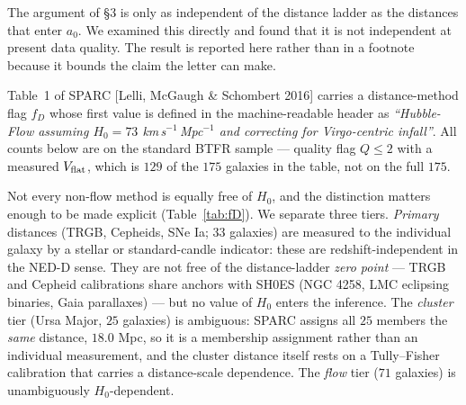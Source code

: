 \documentclass[11pt,a4paper]{article}
\begin{document}
The argument of \S3 is only as independent of the distance ladder as the
distances that enter $a_0$. We examined this directly and found that it is
not independent at present data quality. The result is reported here rather
than in a footnote because it bounds the claim the letter can make.

Table~1 of SPARC [Lelli, McGaugh \& Schombert 2016] carries a distance-method
flag $f_D$ whose first value is defined in the machine-readable header as
\emph{``Hubble-Flow assuming $H_0 = 73$ km\,s$^{-1}$\,Mpc$^{-1}$ and
correcting for Virgo-centric infall''}. All counts below are on the standard
BTFR sample --- quality flag $Q \leq 2$ with a measured $V_{\rm flat}$,
which is $129$ of the $175$ galaxies in the table, not on the full $175$.

Not every non-flow method is equally free of $H_0$, and the distinction
matters enough to be made explicit (Table~\ref{tab:fD}). We separate three
tiers. \emph{Primary} distances (TRGB, Cepheids, SNe Ia; $33$ galaxies) are
measured to the individual galaxy by a stellar or standard-candle indicator:
these are redshift-independent in the NED-D sense. They are not free of the
distance-ladder \emph{zero point} --- TRGB and Cepheid calibrations share
anchors with SH0ES (NGC 4258, LMC eclipsing binaries, Gaia parallaxes) ---
but no value of $H_0$ enters the inference. The \emph{cluster} tier (Ursa
Major, $25$ galaxies) is ambiguous: SPARC assigns all $25$ members the
\emph{same} distance, $18.0$ Mpc, so it is a membership assignment rather
than an individual measurement, and the cluster distance itself rests on a
Tully--Fisher calibration that carries a distance-scale dependence. The
\emph{flow} tier ($71$ galaxies) is unambiguously $H_0$-dependent.
\end{document}
